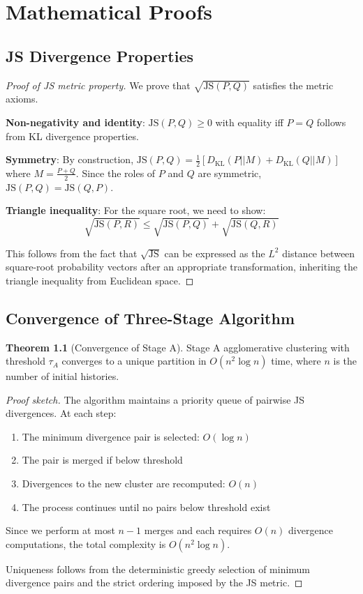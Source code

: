 \documentclass[11pt,a4paper]{report}
\newcommand{\JS}{\text{JS}}
\newcommand{\KL}{D_{\text{KL}}}
\theoremstyle{definition}
\newtheorem{theorem}{Theorem}[chapter]
\begin{document}
\chapter{Mathematical Proofs}
\label{app:proofs}

\section{JS Divergence Properties}

\begin{proof}[Proof of JS metric property]
We prove that $\sqrt{\JS(P,Q)}$ satisfies the metric axioms.

\textbf{Non-negativity and identity}: 
$\JS(P,Q) \geq 0$ with equality iff $P = Q$ follows from KL divergence properties.

\textbf{Symmetry}: 
By construction, $\JS(P,Q) = \frac{1}{2}[\KL(P||M) + \KL(Q||M)]$ where $M = \frac{P+Q}{2}$.
Since the roles of $P$ and $Q$ are symmetric, $\JS(P,Q) = \JS(Q,P)$.

\textbf{Triangle inequality}: 
For the square root, we need to show:
$$\sqrt{\JS(P,R)} \leq \sqrt{\JS(P,Q)} + \sqrt{\JS(Q,R)}$$

This follows from the fact that $\sqrt{\JS}$ can be expressed as the $L^2$ distance between square-root probability vectors after an appropriate transformation, inheriting the triangle inequality from Euclidean space.
\end{proof}

\section{Convergence of Three-Stage Algorithm}

\begin{theorem}[Convergence of Stage A]
\label{thm:stage-a-convergence}
Stage A agglomerative clustering with threshold $\tau_A$ converges to a unique partition in $O(n^2 \log n)$ time, where $n$ is the number of initial histories.
\end{theorem}

\begin{proof}[Proof sketch]
The algorithm maintains a priority queue of pairwise JS divergences. At each step:
\begin{enumerate}
    \item The minimum divergence pair is selected: $O(\log n)$
    \item The pair is merged if below threshold
    \item Divergences to the new cluster are recomputed: $O(n)$
    \item The process continues until no pairs below threshold exist
\end{enumerate}

Since we perform at most $n-1$ merges and each requires $O(n)$ divergence computations, the total complexity is $O(n^2 \log n)$.

Uniqueness follows from the deterministic greedy selection of minimum divergence pairs and the strict ordering imposed by the JS metric.
\end{proof}
\end{document}
